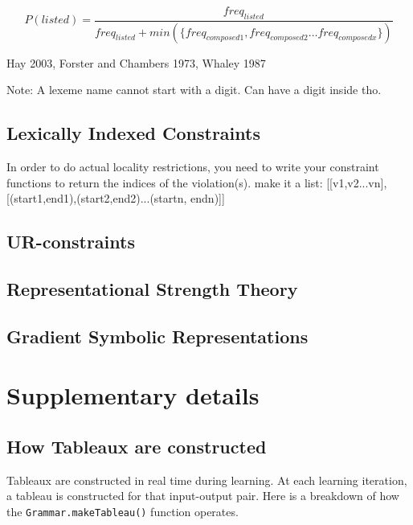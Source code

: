 \documentclass[12]{article}
\begin{document}
		\[
		P(listed) = \frac{freq_{listed}}{freq_{listed} + min(\{freq_{composed1}, freq_{composed2}\ldots freq_{composedx}\})}
		\]
		
		Hay 2003, Forster and Chambers 1973, Whaley 1987 %

		Note: A lexeme name cannot start with a digit.  Can have a digit inside tho.

	\subsection{Lexically Indexed Constraints}
		
		In order to do actual locality restrictions, you need to write your constraint functions to return the indices of the violation(s).  make it a list: [[v1,v2...vn],[(start1,end1),(start2,end2)...(startn, endn)]]
		

		
	\subsection{UR-constraints}

	\subsection{Representational Strength Theory}

	\subsection{Gradient Symbolic Representations}


\section{Supplementary details}
	\subsection{How Tableaux are constructed}
	Tableaux are constructed in real time during learning. At each learning iteration, a tableau is constructed for that input-output pair.  Here is a breakdown of how the \texttt{Grammar.makeTableau()} function operates.
	
\end{document}
